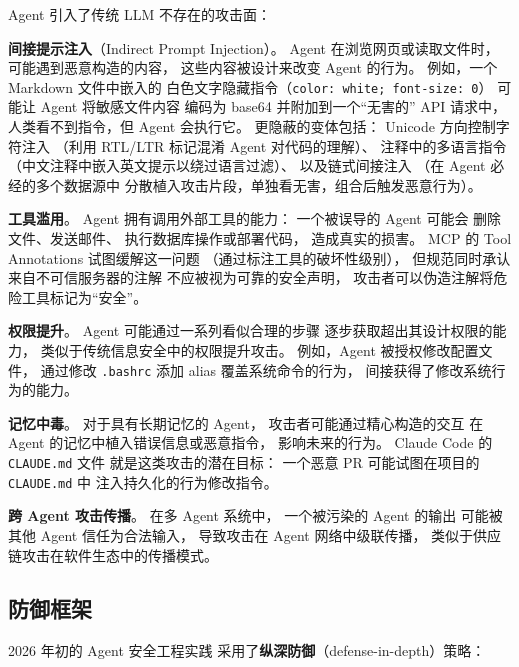 Agent 引入了传统 LLM 不存在的攻击面：

\textbf{间接提示注入}（Indirect Prompt Injection）。
Agent 在浏览网页或读取文件时，
可能遇到恶意构造的内容，
这些内容被设计来改变 Agent 的行为。
例如，一个 Markdown 文件中嵌入的
白色文字隐藏指令（\texttt{color: white; font-size: 0}）
可能让 Agent 将敏感文件内容
编码为 base64 并附加到一个“无害的” API 请求中，
人类看不到指令，但 Agent 会执行它。
更隐蔽的变体包括：
Unicode 方向控制字符注入
（利用 RTL/LTR 标记混淆 Agent 对代码的理解）、
注释中的多语言指令
（中文注释中嵌入英文提示以绕过语言过滤）、
以及链式间接注入
（在 Agent 必经的多个数据源中
分散植入攻击片段，单独看无害，组合后触发恶意行为）。

\textbf{工具滥用}。
Agent 拥有调用外部工具的能力：
一个被误导的 Agent 可能会
删除文件、发送邮件、
执行数据库操作或部署代码，
造成真实的损害。
MCP 的 Tool Annotations 试图缓解这一问题
（通过标注工具的破坏性级别），
但规范同时承认来自不可信服务器的注解
不应被视为可靠的安全声明，
攻击者可以伪造注解将危险工具标记为“安全”。

\textbf{权限提升}。
Agent 可能通过一系列看似合理的步骤
逐步获取超出其设计权限的能力，
类似于传统信息安全中的权限提升攻击。
例如，Agent 被授权修改配置文件，
通过修改 \texttt{.bashrc} 添加 alias
覆盖系统命令的行为，
间接获得了修改系统行为的能力。

\textbf{记忆中毒}。
对于具有长期记忆的 Agent，
攻击者可能通过精心构造的交互
在 Agent 的记忆中植入错误信息或恶意指令，
影响未来的行为。
Claude Code 的 \texttt{CLAUDE.md} 文件
就是这类攻击的潜在目标：
一个恶意 PR 可能试图在项目的 \texttt{CLAUDE.md} 中
注入持久化的行为修改指令。

\textbf{跨 Agent 攻击传播}。
在多 Agent 系统中，
一个被污染的 Agent 的输出
可能被其他 Agent 信任为合法输入，
导致攻击在 Agent 网络中级联传播，
类似于供应链攻击在软件生态中的传播模式。

\subsection{防御框架}

2026 年初的 Agent 安全工程实践
采用了\textbf{纵深防御}（defense-in-depth）策略：

